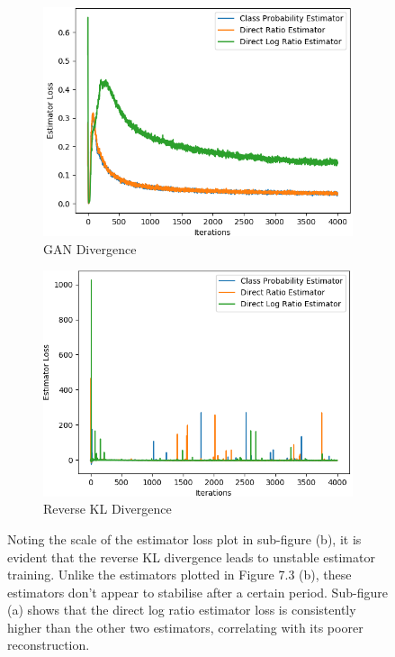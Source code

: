 \documentclass[honours,12pt]{unswthesis}
\numberwithin{equation}{section}
\theoremstyle{definition}
\begin{document}
\begin{figure}[h!]
\centering
\begin{subfigure}{0.49\textwidth}
\includegraphics[width=\linewidth]{part3estimatorlosses/PCADVvsPCADVexpvsPCADVgudlog.png}
\caption{GAN Divergence}
\end{subfigure}
\begin{subfigure}{0.49\textwidth}
\includegraphics[width=\linewidth]{part3estimatorlosses/PCKLDvsPCKLexpvsPCKLgudlog.png}
\caption{Reverse KL Divergence}
\end{subfigure}
\caption{\small Noting the scale of the estimator loss plot in sub-figure (b), it is evident that the reverse KL divergence leads to unstable estimator training. Unlike the estimators plotted in Figure 7.3 (b), these estimators don't appear to stabilise after a certain period. Sub-figure (a) shows that the direct log ratio estimator loss is consistently higher than the other two estimators, correlating with its poorer reconstruction.}
\end{figure}
\end{document}
